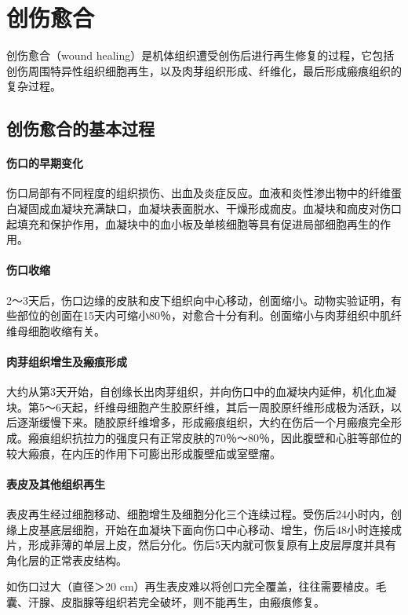 \section{创伤愈合}

创伤愈合（wound
healing）是机体组织遭受创伤后进行再生修复的过程，它包括创伤周围特异性组织细胞再生，以及肉芽组织形成、纤维化，最后形成瘢痕组织的复杂过程。

\subsection{创伤愈合的基本过程}

\paragraph{伤口的早期变化}
伤口局部有不同程度的组织损伤、出血及炎症反应。血液和炎性渗出物中的纤维蛋白凝固成血凝块充满缺口，血凝块表面脱水、干燥形成痂皮。血凝块和痂皮对伤口起填充和保护作用，血凝块中的血小板及单核细胞等具有促进局部细胞再生的作用。

\paragraph{伤口收缩}
2～3天后，伤口边缘的皮肤和皮下组织向中心移动，创面缩小。动物实验证明，有些部位的创面在15天内可缩小80％，对愈合十分有利。创面缩小与肉芽组织中肌纤维母细胞收缩有关。

\paragraph{肉芽组织增生及瘢痕形成}
大约从第3天开始，自创缘长出肉芽组织，并向伤口中的血凝块内延伸，机化血凝块。第5～6天起，纤维母细胞产生胶原纤维，其后一周胶原纤维形成极为活跃，以后逐渐缓慢下来。随胶原纤维增多，形成瘢痕组织，大约在伤后一个月瘢痕完全形成。瘢痕组织抗拉力的强度只有正常皮肤的70％～80％，因此腹壁和心脏等部位的较大瘢痕，在内压的作用下可膨出形成腹壁疝或室壁瘤。

\paragraph{表皮及其他组织再生}
表皮再生经过细胞移动、细胞增生及细胞分化三个连续过程。受伤后24小时内，创缘上皮基底层细胞，开始在血凝块下面向伤口中心移动、增生，伤后48小时连接成片，形成菲薄的单层上皮，然后分化。伤后5天内就可恢复原有上皮层厚度并具有角化层的正常表皮结构。

如伤口过大（直径＞20
cm）再生表皮难以将创口完全覆盖，往往需要植皮。毛囊、汗腺、皮脂腺等组织若完全破坏，则不能再生，由瘢痕修复。

